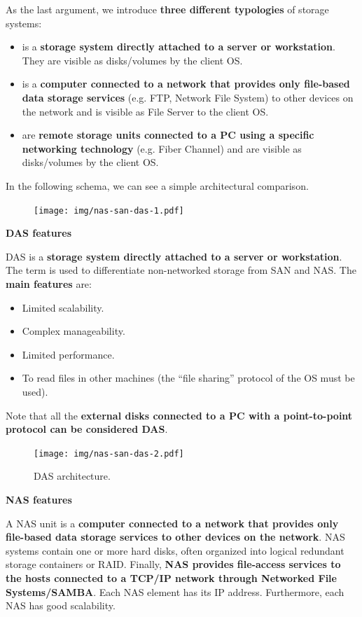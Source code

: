 As the last argument, we introduce \textbf{three different typologies} of storage systems:
\begin{itemize}
	\item {} is a \textbf{storage system directly attached to a server or workstation}. They are visible as disks/volumes by the client OS.
	
	\item {} is a \textbf{computer connected to a network that provides only file-based data storage services} (e.g. FTP, Network File System) to other devices on the network and is visible as File Server to the client OS.
	
	\item {} are \textbf{remote storage units connected to a PC using a specific networking technology} (e.g. Fiber Channel) and are visible as disks/volumes by the client OS.
\end{itemize}
In the following schema, we can see a simple architectural comparison.
\begin{figure}[!htp]
	\centering
	\texttt{[image: img/nas-san-das-1.pdf]}
\end{figure}

\begin{flushleft}
	\textcolor{Red2}{ \textbf{DAS features}}
\end{flushleft}
DAS is a \textbf{storage system directly attached to a server or workstation}. The term is used to differentiate non-networked storage from SAN and NAS. The \textbf{main features} are:
\begin{itemize}
	\item Limited scalability.
	\item Complex manageability.
	\item Limited performance.
	\item To read files in other machines (the ``file sharing'' protocol of the OS must be used).
\end{itemize}
Note that all the \textbf{external disks connected to a PC with a point-to-point protocol can be considered DAS}.
\begin{figure}[!htp]
	\centering
	\texttt{[image: img/nas-san-das-2.pdf]}
	\caption{DAS architecture.}
\end{figure}

\highspace
\begin{flushleft}
	\textcolor{Red2}{ \textbf{NAS features}}
\end{flushleft}
A NAS unit is a \textbf{computer connected to a network that provides only file-based data storage services to other devices on the network}. NAS systems contain one or more hard disks, often organized into logical redundant storage containers or RAID. Finally, \textbf{NAS provides file-access services to the hosts connected to a TCP/IP network through Networked File Systems/SAMBA}. Each NAS element has its IP address. Furthermore, each NAS has good scalability.

